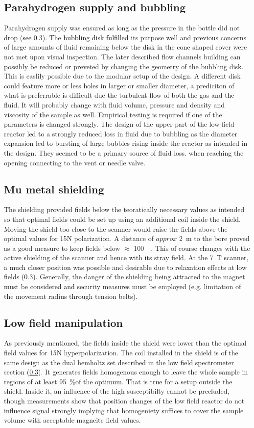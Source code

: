         \subsection{Parahydrogen supply and bubbling}
            Parahydrogen supply was ensured as long as the pressure in the bottle did not drop (see \ref{}). The bubbling disk fulfilled its purpose well and previous concerns of large amounts of fluid remaining below the disk in the cone shaped cover were not met upon visual inspection. The later described flow channels building can possibly be reduced or preveted by changing the geometry of the bubbling disk. This is easlily possible due to the modular setup of the design. A different disk could feature more or less holes in larger or smaller diameter, a prediciton of what is preferrable is difficult due the turbulent flow of both the gas and the fluid. It will probably change with fluid volume, pressure and density and viscosity of the sample as well. Empirical testing is required if one of the parameters is changed strongly.
            The design of the upper part of the low field reactor led to a strongly reduced loss in fluid due to bubbling as the diameter expansion led to bursting of large bubbles rising inside the reactor as intended in the design. They seemed to be a primary source of fluid loss. when reaching the opening connecting to the vent or needle valve.
        \subsection{Mu metal shielding}
            The shielding provided fields below the teoratically necessary values as intended so that optimal fields could be set up using an additional coil inside the shield. Moving the shield too close to the scanner would raise the fields above the optimal values for 15N polarization. A distance of $approx$ \SI{2}{\meter} to the bore proved as a good measure to keep fields below $\approx$ \SI{100}{\nano\telsa}. This of course changes with the active shielding of the scanner and hence with its stray field. At the \SI{7}{\tesla} scanner, a much closer position was possible and desirable due to relaxation effects at low fields (\ref{}). Generally, the danger of the shielding being attracted to the magnet must be considered and security measures must be employed (e.g. limitation of the movement radius through tension belts).
        \subsection{Low field manipulation}
            As previously mentioned, the fields inside the shield were lower than the optimal field values for 15N hyperpolarization. The coil installed in the shield is of the same design as the dual hemholtz set described in the low field spectrometer section (\ref{}). It generates fields homogenous enough to leave the whole sample in regions of at least \SI{95}{\%}of the optimum. That is true for a setup outside the shield. Inside it, an influence of the high susceptibilty cannot be precluded, though measurements show that position changes of the low field reactor do not influence signal strongly implying that homogeniety suffices to cover the sample volume with acceptable magneitc field values.

